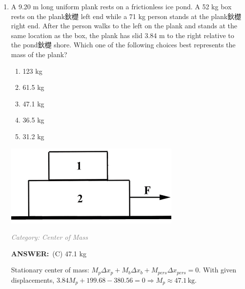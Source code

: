 ﻿\documentclass[12pt, a4paper]{article}
\makeatletter
\newcommand{\finalanswer}[1]{\textbf{ANSWER:}~#1}
\newif\if@categoryprinted
\newcommand{\category}[1]{\if@categoryprinted\relax\else\textit{\textcolor{gray}{Category: #1}}\global\@categoryprintedtrue\fi}
\makeatother
\begin{document}
\begin{CJK*}{UTF8}{gbsn}
\begin{enumerate}[itemsep=1.0em, topsep=0.6em]
\item \label{prob:29}
\noindent\begin{minipage}[t]{0.6\linewidth}
\vspace{0pt}
A 9.20 m long uniform plank rests on a frictionless ice pond. A 52 kg box rests on the plank鈥檚 left end while a 71 kg person stands at the plank鈥檚 right end. After the person walks to the left on the plank and stands at the same location as the box, the plank has slid 3.84 m to the right relative to the pond鈥檚 shore. Which one of the following choices best represents the mass of the plank?
\begin{enumerate}[label=(\Alph*)]
    \item 123 kg
    \item 61.5 kg
    \item 47.1 kg
    \item 36.5 kg
    \item 31.2 kg
\end{enumerate}
\end{minipage}%
\hfill
\begin{minipage}[t]{0.35\linewidth}
\vspace{0pt}
\centering
\includegraphics[width=\linewidth]{Problem_31_Figure.png}
\end{minipage}

\category{Center of Mass}
\begin{answerbox}
\finalanswer{(C) 47.1 kg}
\end{answerbox}
\begin{solutionbox}

Stationary center of mass: $M_p\Delta x_p+M_b\Delta x_b+M_{pers}\Delta x_{pers}=0$. With given displacements, $3.84M_p+199.68-380.56=0 \Rightarrow M_p\approx47.1\,\text{kg}$.
\end{solutionbox}


\end{enumerate}
\end{CJK*}
\end{document}
